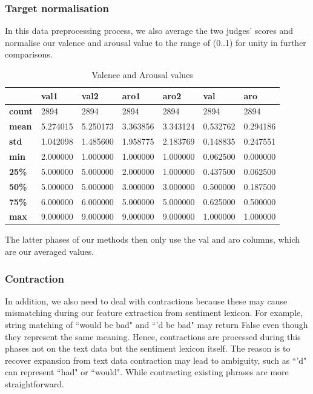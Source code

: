 \documentclass[12pt]{article}
\begin{document}
\subsubsection{Target normalisation}
In this data preprocessing process, we also average the two judges' scores and normalise our valence and arousal value to the range of (0..1) for unity in further comparisons.
\begin{table}[H]
	\centering
	\begin{tabular}{| l | l | l | l | l | l | l |}
		\hline
		& \textbf{val1} & \textbf{val2} & \textbf{aro1} & \textbf{aro2} & \textbf{val} & \textbf{aro}\\
		\hline
		\textbf{count} & 2894 & 2894 & 2894 & 2894 & 2894 & 2894\\
		\hline
		\textbf{mean} & 5.274015 & 5.250173 & 3.363856 & 3.343124 & 0.532762 & 0.294186\\
		\hline
		\textbf{std} & 1.042098 & 1.485600 & 1.958775 & 2.183769 & 0.148835 & 0.247551\\
		\hline
		\textbf{min} & 2.000000 & 1.000000 & 1.000000 & 1.000000 & 0.062500 & 0.000000\\
		\hline
		\textbf{25\%} & 5.000000 & 5.000000 & 2.000000 & 1.000000 & 0.437500 & 0.062500\\
		\hline
		\textbf{50\%} & 5.000000 & 5.000000 & 3.000000 & 3.000000 & 0.500000 & 0.187500\\
		\hline
		\textbf{75\%} & 6.000000 & 6.000000 & 5.000000 & 5.000000 & 0.625000 & 0.500000\\
		\hline
		\textbf{max} & 9.000000 & 9.000000 & 9.000000 & 9.000000 & 1.000000 & 1.000000\\
		\hline
	\end{tabular}
	\caption{Valence and Arousal values}
	\label{tb:val_aro_processed}
\end{table}
The latter phases of our methods then only use the val and aro columns, which are our averaged values.

\subsubsection{Contraction} \label{contraction}

In addition, we also need to deal with contractions because these may cause mismatching during our feature extraction from sentiment lexicon. For example, string matching of ``would be bad" and ``'d be bad" may return False even though they represent the same meaning. Hence, contractions are processed during this phases not on the text data but the sentiment lexicon itself. The reason is to recover expansion from text data contraction may lead to ambiguity, such as ``'d" can represent ``had" or ``would". While contracting existing phrases are more straightforward.
\end{document}
